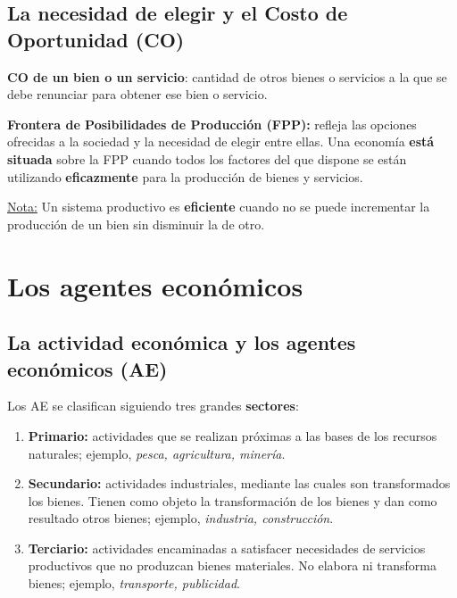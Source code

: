 \documentclass[10pt,a4paper]{article}
\begin{document}
\subsection{La necesidad de elegir y el Costo de Oportunidad (CO)}

\begin{description}
\item \textbf{CO de un bien o un servicio}: cantidad de otros bienes o servicios a la que se debe renunciar para obtener ese bien o servicio.
\item \textbf{Frontera de Posibilidades de Producción (FPP):} refleja las opciones ofrecidas a la sociedad y la necesidad de elegir entre ellas. Una economía \textbf{está situada} sobre la FPP cuando todos los factores del que dispone se están utilizando \textbf{eficazmente} para la producción de bienes y servicios.
\end{description}

\underline{Nota:} Un sistema productivo es \textbf{eficiente} cuando no se puede incrementar la producción de un bien sin disminuir la de otro.

\section{Los agentes económicos}

\subsection{La actividad económica y los agentes económicos (AE)}

Los AE se clasifican siguiendo tres grandes \textbf{sectores}:

\begin{enumerate}
\item \textbf{Primario:} actividades que se realizan próximas a las bases de los recursos naturales; ejemplo, \textit{pesca, agricultura, minería}.
\item \textbf{Secundario:} actividades industriales, mediante las cuales son transformados los bienes. Tienen como objeto la transformación de los bienes y dan como resultado otros bienes; ejemplo, \textit{industria, construcción}.
\item \textbf{Terciario:} actividades encaminadas a satisfacer necesidades de servicios productivos que no produzcan bienes materiales. No elabora ni transforma bienes; ejemplo, \textit{transporte, publicidad}.
\end{enumerate}
\end{document}

